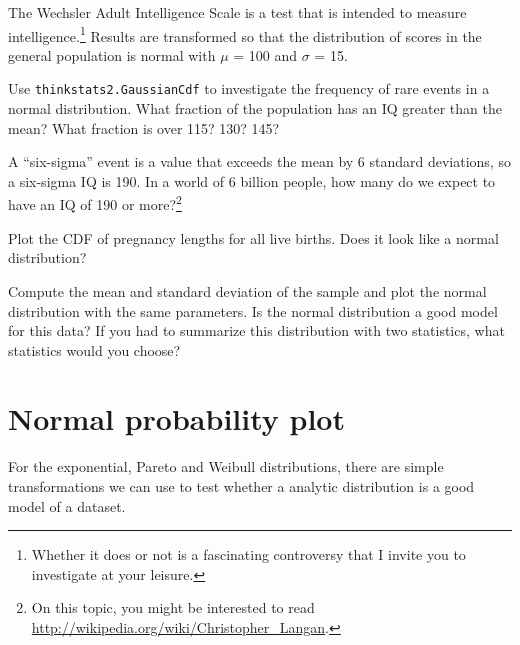 \documentclass[12pt]{book}
\begin{document}
\begin{exercise}
The Wechsler Adult Intelligence Scale is a test that is intended
to measure intelligence.\footnote{Whether it does or not is a
fascinating controversy that I invite you to investigate at your
leisure.}  Results are transformed so that the distribution of scores
in the general population is normal with $\mu$ = 100 and $\sigma$ = 15.

Use {\tt thinkstats2.GaussianCdf} to investigate the frequency of rare
events in a normal distribution.  What fraction of the population has
an IQ greater than the mean?  What fraction is over 115?  130?  145?

A ``six-sigma'' event is a value that exceeds the mean by 6 standard
deviations, so a six-sigma IQ is 190.  In a world of 6 billion people,
how many do we expect to have an IQ of 190 or more?\footnote{On this
  topic, you might be interested to read
  \url{http://wikipedia.org/wiki/Christopher_Langan}.}

\end{exercise}


\begin{exercise}
Plot the CDF of pregnancy lengths for all live births.  Does it
look like a normal distribution?

Compute the mean and standard deviation of the sample and plot the
normal distribution with the same parameters.  Is the normal
distribution a good model for this data?  If you had to summarize this
distribution with two statistics, what statistics would you choose?

\end{exercise}


\section{Normal probability plot}

For the exponential, Pareto and Weibull distributions, there are
simple transformations we can use to test whether a analytic
distribution is a good model of a dataset.
\end{document}
